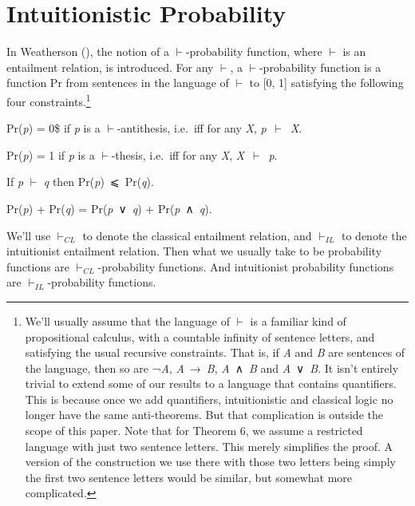 \documentclass[
  10pt,
  letterpaper,
  DIV=11,
  numbers=noendperiod,
  twoside]{scrartcl}
\providecommand{\tightlist}{%
  \setlength{\itemsep}{0pt}\setlength{\parskip}{0pt}}\usepackage{longtable,booktabs,array}
\begin{document}
\section{Intuitionistic Probability}\label{intuitionistic-probability}

In Weatherson (), the notion of a
\(\vdash\)-probability function, where \(\vdash\) is an entailment
relation, is introduced. For any \(\vdash\), a \(\vdash\)-probability
function is a function Pr from sentences in the language of \(\vdash\)
to {[}0, 1{]} satisfying the following four constraints.\footnote{We'll
  usually assume that the language of \(\vdash\) is a familiar kind of
  propositional calculus, with a countable infinity of sentence letters,
  and satisfying the usual recursive constraints. That is, if \emph{A}
  and \emph{B} are sentences of the language, then so are ¬\emph{A},
  \emph{A}~→~\emph{B}, \emph{A}~∧~\emph{B} and \emph{A}~∨~\emph{B}. It
  isn't entirely trivial to extend some of our results to a language
  that contains quantifiers. This is because once we add quantifiers,
  intuitionistic and classical logic no longer have the same
  anti-theorems. But that complication is outside the scope of this
  paper. Note that for Theorem 6, we assume a restricted language with
  just two sentence letters. This merely simplifies the proof. A version
  of the construction we use there with those two letters being simply
  the first two sentence letters would be similar, but somewhat more
  complicated.}

\begin{description}
\tightlist
\item[(P0)]
Pr(\emph{p}) = 0\$ if \emph{p} is a \(\vdash\)-antithesis, i.e.~iff for
any \emph{X}, \emph{p}~\(\vdash\)~\emph{X}.
\item[(P1)]
Pr(\emph{p}) = 1 if \emph{p} is a \(\vdash\)-thesis, i.e.~iff for any
\emph{X}, \emph{X}~\(\vdash\)~\emph{p}.
\item[(P2)]
If \emph{p} \(\vdash\) \emph{q} then Pr(\emph{p})~⩽~Pr(\emph{q}).
\item[(P3)]
Pr(\emph{p}) + Pr(\emph{q}) = Pr(\emph{p}~∨~\emph{q}) +
Pr(\emph{p}~∧~\emph{q}).
\end{description}

We'll use \(\vdash_{CL}\) to denote the classical entailment relation,
and \(\vdash_{IL}\) to denote the intuitionist entailment relation. Then
what we usually take to be probability functions are
\(\vdash_{CL}\)-probability functions. And intuitionist probability
functions are \(\vdash_{IL}\)-probability functions.
\end{document}
